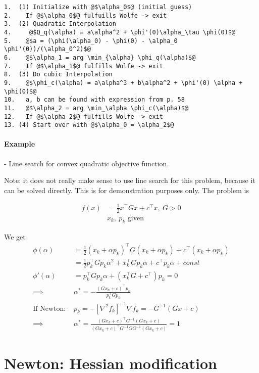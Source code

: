 \documentclass{article}
\begin{document}
\medskip
\lstset{basicstyle=\ttfamily}
\begin{lstlisting}
1.  (1) Initialize with @$\alpha_0$@ (initial guess)
2.    If @$\alpha_0$@ fulfuills Wolfe -> exit
3.  (2) Quadratic Interpolation
4.     @$Q_q(\alpha) = a\alpha^2 + \phi'(0)\alpha_\tau \phi(0)$@
5.    @$a = (\phi(\alpha_0) - \phi(0) - \alpha_0 \phi'(0))/(\alpha_0^2)$@
6.    @$\alpha_1 = arg \min_{\alpha} \phi_q(\alpha)$@
7.    If @$\alpha_1$@ fulfills Wolfe -> exit
8.  (3) Do cubic Interpolation
9.    @$\phi_c(\alpha) = a\alpha^3 + b\alpha^2 + \phi'(0) \alpha + \phi(0)$@
10.   a, b can be found with expression from p. 58
11.   @$\alpha_2 = arg \min_\alpha \phi_c(\alpha)$@
12.   If @$\alpha_2$@ fulfills Wolfe -> exit
13. (4) Start over with @$\alpha_0 = \alpha_2$@
\end{lstlisting}

\paragraph{Example}- Line search for convex quadratic objective function.

\medskip Note: it does not really make sense to use line search for this problem, because it can be solved directly. This is
for demonstration purposes only. The problem is

\begin{align*}
  f(x) & = \frac{1}{2}x^{\top}Gx + c^{\top}x,\  G > 0 \\
       & x_k,\  p_k \text{ given}
\end{align*}

We get
\begin{align*}
  \phi(\alpha)  & = \frac{1}{2}(x_k + \alpha p_k)^{\top}G(x_k+\alpha p_k) + c^{\top}(x_k + \alpha p_k)          \\
                & = \frac{1}{2} p_k^{\top}G p_k \alpha^2 + x_k^{\top}G p_k \alpha + c^{\top} p_k \alpha + const \\
  \phi'(\alpha) & = p_k^{\top}Gp_k \alpha + (x_k^{\top}G+c^{\top})p_k = 0 \\ 
  \implies& \alpha^* = - \frac{(Gx_n+c)^{\top}p_k}{p_k^{\top}Gp_k} \\ 
  \text{If Newton: } & p_k = - [\nabla ^2 f_k]^{-1} \nabla f_k = -G^{-1}(Gx+c) \\ 
  \implies & \alpha^* = \frac{(Gx_k+ c)^{\top}G^{-1}(Gx_k +c)}{(Gx_k+c)^{\top}G^{-1}G G^{-1}(Gx_k+c)} = 1
\end{align*}

\section{Newton: Hessian modification}
\end{document}

